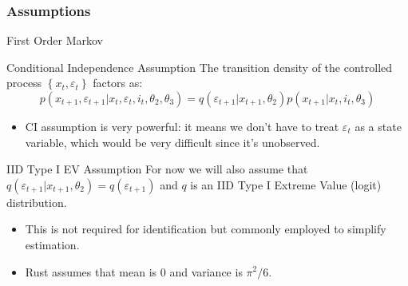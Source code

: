 \documentclass[xcolor=pdftex,dvipsnames,table,mathserif]{beamer}
\begin{document}
\begin{frame}
\frametitle{Assumptions}
\begin{block}{First Order Markov}\end{block}\vspace{-0.5cm}
\begin{block}{Conditional Independence Assumption}
The transition density of the controlled process $\left\{x_{t},\varepsilon_{t}\right\}$ factors as:\[
p\left(x_{t+1},\varepsilon_{t+1}|x_{t},\varepsilon_{t},i_{t},\theta_{2},\theta_{3}\right)
= q\left(\varepsilon_{t+1}|x_{t+1},\theta_{2}\right)p\left(x_{t+1}|x_{t},i_{t},\theta_{3}\right)
\]
\end{block}

\begin{itemize}
	\item CI assumption is very powerful: it means we don't have to treat $\varepsilon_{t}$ as
	a state variable, which would be very difficult since it's unobserved.
\end{itemize}
\begin{block}{IID Type I EV Assumption}
For now we will also assume that $ q\left(\varepsilon_{t+1}|x_{t+1},\theta_{2}\right) =  q\left(\varepsilon_{t+1}\right)$ and $q$ is an IID Type I Extreme Value (logit) distribution.
\end{block}
\begin{itemize}
\item This is not required for identification but commonly employed to simplify estimation.
\item Rust assumes that mean is $0$ and variance is $\pi^2/6$.
\end{itemize}
\end{frame}
\end{document}
